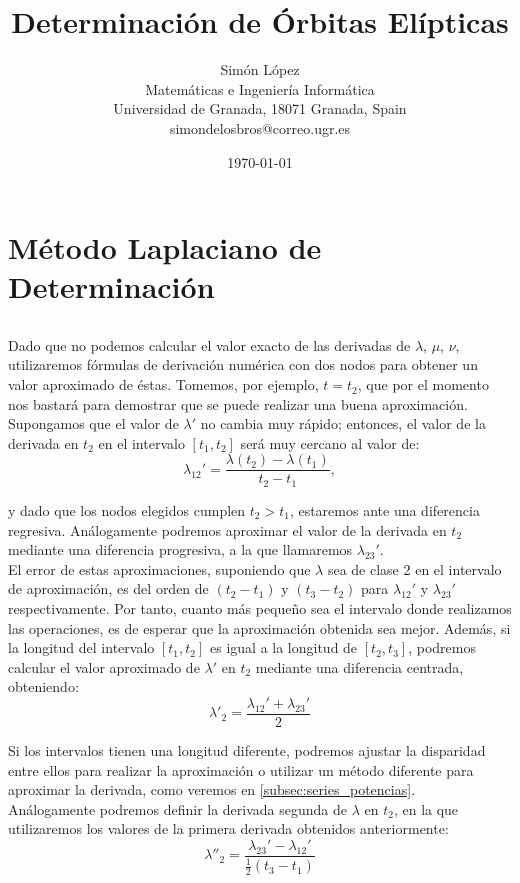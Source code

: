 \documentclass[11pt]{article}
\title{Determinación de Órbitas Elípticas}
\author{Simón López
\\
{\small Matemáticas e Ingeniería Informática}
\\
{\small Universidad de Granada, 18071 Granada, Spain}
\\
{\small simondelosbros@correo.ugr.es}}
\date{\today}
\begin{document}
\section{Método Laplaciano de Determinación}
\subsection{}
\label{subsec:primera_segunda_derivada}
Dado que no podemos calcular el valor exacto de las derivadas de $\lambda$, $\mu$, $\nu$, utilizaremos fórmulas de derivación numérica con dos nodos para obtener un valor aproximado de éstas. Tomemos, por ejemplo, $t=t_2$, que por el momento nos bastará para demostrar que se puede realizar una buena aproximación. Supongamos que el valor de $\lambda'$ no cambia muy rápido; entonces, el valor de la derivada en $t_2$ en el intervalo $[t_1,t_2]$ será muy cercano al valor de:
\[
\lambda_{12}'=\frac{\lambda(t_2)-\lambda(t_1)}{t_2-t_1},
\]

\noindent y dado que los nodos elegidos cumplen $t_2>t_1$, estaremos ante una diferencia regresiva. Análogamente podremos aproximar el valor de la derivada en $t_2$ mediante una diferencia progresiva, a la que llamaremos $\lambda_{23}'$.\\

El error de estas aproximaciones, suponiendo que $\lambda$ sea de clase 2 en el intervalo de aproximación, es del orden de $(t_2-t_1)$ y $(t_3-t_2)$ para $\lambda_{12}'$ y $\lambda_{23}'$ respectivamente. Por tanto, cuanto más pequeño sea el intervalo donde realizamos las operaciones, es de esperar que la aproximación obtenida sea mejor. Además, si la longitud del intervalo $[t_1,t_2]$ es igual a la longitud de $[t_2,t_3]$, podremos calcular el valor aproximado de $\lambda'$ en $t_2$ mediante una diferencia centrada, obteniendo:
\[
\lambda'_2=\frac{\lambda_{12}'+\lambda_{23}'}{2}
\]

Si los intervalos tienen una longitud diferente, podremos ajustar la disparidad entre ellos para realizar la aproximación o utilizar un método diferente para aproximar la derivada, como veremos en \ref{subsec:series_potencias}.\\

Análogamente podremos definir la derivada segunda de $\lambda$ en $t_2$, en la que utilizaremos los valores de la primera derivada obtenidos anteriormente:
\[
\lambda''_2=\frac{\lambda_{23}'-\lambda_{12}'}{\frac{1}{2}(t_3-t_1)}
\]
\end{document}
